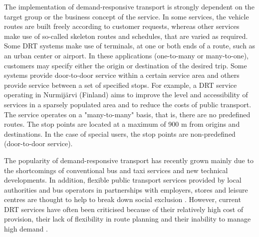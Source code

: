 \documentclass[dissertation,draft*]{aaltoseries}
\begin{document}
The implementation of demand-responsive transport is strongly dependent on the target group
or the business concept of the service. In some services, the vehicle routes are built 
freely according to customer requests, whereas 
other services make use of so-called skeleton routes and schedules, that are varied as required. 
Some DRT systems make use of terminals, at one or both ends of a route, such as an urban center or airport.
In these applications (one-to-many or many-to-one), customers may specify either the origin or destination of the 
desired trip. Some systems provide door-to-door service within a certain service area and others provide 
service between a set of specified stops. 
For example, a DRT service operating in Nurmij\"arvi (Finland) aims to improve the level and
accessibility of services in a sparsely populated area and
to reduce the costs of public transport. The service operates on
a "many-to-many" basis, that is, there are no predefined routes. 
The stop points are located at a maximum of
900 m from origins and destinations. In the case of
special users, the stop points are non-predefined (door-to-door service). 


The popularity of demand-responsive transport has recently grown
mainly due to the shortcomings of conventional
bus and taxi services and new technical developments.
In addition, flexible public transport services provided by local authorities and bus operators in
partnerships with employers, stores and leisure centres are thought to help to break down social exclusion \cite{detr}.
However, current DRT services have often been
criticised because of their relatively high cost of provision,
their lack of flexibility in route planning and their
inability to manage high demand \cite{mageean}. 
\end{document}

